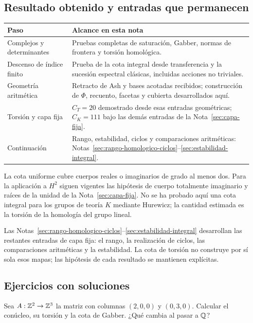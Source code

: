 \clearpage
\subsection{Resultado obtenido y entradas que permanecen}

\begin{center}
\small
\begin{tabularx}{\textwidth}{@{}p{}Y@{}}
\toprule
Paso & Alcance en esta nota\\
\midrule
Complejos y determinantes &
Pruebas completas de saturación, Gabber, normas de frontera
y torsión homológica.\\
Descenso de índice finito &
Prueba de la cota integral desde transferencia y la sucesión
espectral clásicas, incluidas acciones no triviales.\\
Geometría aritmética &
Retracto de Ash y bases acotadas recibidos; construcción de
$\Phi$, recuento, facetas y cubierta desarrollados aquí.\\
Torsión y capa fija &
$C_T=20$ demostrado desde esas entradas geométricas;
$C_K=111$ bajo las demás entradas de la Nota~\ref{sec:capa-fija}.\\
Continuación &
Rango, estabilidad, ciclos y comparaciones aritméticas:
Notas~\ref{sec:rango-homologico-ciclos}--\ref{sec:estabilidad-integral}.\\
\bottomrule
\end{tabularx}
\end{center}

La cota uniforme cubre cuerpos reales o imaginarios de grado
al menos dos. Para la aplicación a $H^2$ siguen vigentes
las hipótesis de cuerpo totalmente imaginario y raíces de
la unidad de la Nota~\ref{sec:capa-fija}.
No se ha probado aquí una cota integral para los grupos de
teoría $K$ mediante Hurewicz; la cantidad estimada es la
torsión de la homología del grupo lineal.

Las Notas~\ref{sec:rango-homologico-ciclos}--\ref{sec:estabilidad-integral}
desarrollan las restantes entradas de capa fija: el rango, la
realización de ciclos, las comparaciones aritméticas y la estabilidad.
La cota de torsión no construye por sí sola esos mapas; las hipótesis
de cada resultado se mantienen explícitas.

\clearpage
\subsection{Ejercicios con soluciones}

\begin{ejercicio}
Sea $A:\mathbb{Z}^2\to\mathbb{Z}^3$ la matriz con columnas
$(2,0,0)$ y $(0,3,0)$. Calcular el conúcleo, su torsión
y la cota de Gabber. ¿Qué cambia al pasar a $\mathbb{Q}$?
\end{ejercicio}

